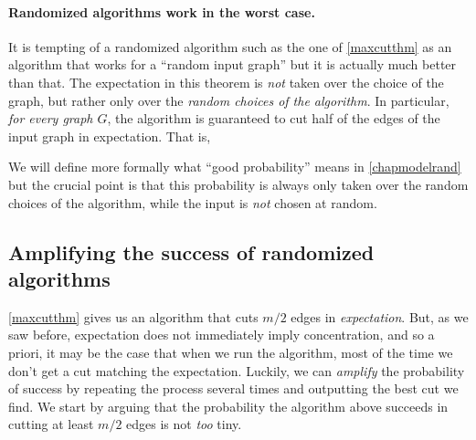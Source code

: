 \paragraph{Randomized algorithms work in the worst case.} It is tempting
of a randomized algorithm such as the one of \cref{maxcutthm} as an
algorithm that works for a ``random input graph'' but it is actually
much better than that. The expectation in this theorem is \emph{not}
taken over the choice of the graph, but rather only over the
\emph{random choices of the algorithm}. In particular, \emph{for every
graph \(G\)}, the algorithm is guaranteed to cut half of the edges of
the input graph in expectation. That is,

\hypertarget{randomworstcaseidea}{}

We will define more formally what ``good probability'' means in
\cref{chapmodelrand} but the crucial point is that this probability is
always only taken over the random choices of the algorithm, while the
input is \emph{not} chosen at random.

\subsection{Amplifying the success of randomized
algorithms}\label{Amplifying-the-success-of}

\cref{maxcutthm} gives us an algorithm that cuts \(m/2\) edges in
\emph{expectation}. But, as we saw before, expectation does not
immediately imply concentration, and so a priori, it may be the case
that when we run the algorithm, most of the time we don't get a cut
matching the expectation. Luckily, we can \emph{amplify} the probability
of success by repeating the process several times and outputting the
best cut we find. We start by arguing that the probability the algorithm
above succeeds in cutting at least \(m/2\) edges is not \emph{too} tiny.

\hypertarget{cutprob}{}

